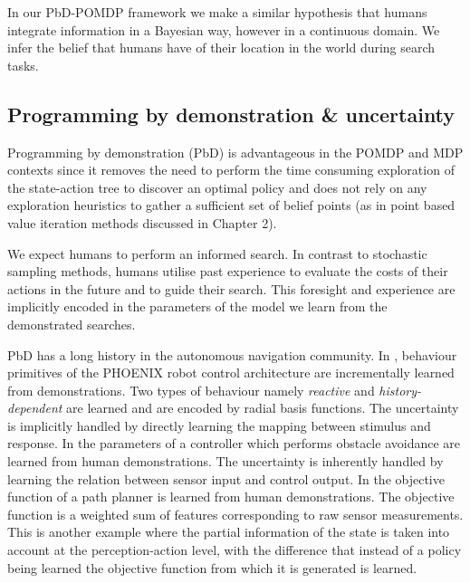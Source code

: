 In our PbD-POMDP framework we make a similar hypothesis that humans integrate information in a Bayesian way, however in a 
continuous domain. We infer the belief that humans have of their location in the world during search tasks.

\subsection{Programming by demonstration \& uncertainty}

Programming by demonstration (PbD) is advantageous in the POMDP and MDP contexts since it removes the need to perform the time 
consuming exploration of the state-action tree to discover an optimal policy and does not rely on any exploration 
heuristics to gather a sufficient set of belief points (as in point based value iteration methods discussed in Chapter 2).

We expect humans to perform an informed search. In contrast to stochastic sampling methods, 
humans utilise past experience to evaluate the costs of their actions in the future and to guide their search. This foresight and experience are implicitly encoded 
in the parameters of the model we learn from the demonstrated searches.

PbD has a long history in the autonomous navigation community. In \cite{Kasper2001153}, behaviour primitives of 
the PHOENIX robot control architecture are incrementally 
learned from demonstrations. Two types of behaviour namely \textit{reactive} and \textit{history-dependent} are 
learned and are encoded by radial basis functions. The
uncertainty is implicitly handled by directly learning the mapping between stimulus and response. In \cite{Hamner_2006_5810} the parameters of a
controller which performs obstacle avoidance are learned from human demonstrations. The uncertainty is inherently handled 
by learning the relation between sensor input and control output. In \cite{LfD_Autonomous_Navigation_in_Complex_Unstructured_Terrain} the objective function of a path planner is learned from human demonstrations. 
The objective function is a weighted sum of features corresponding to raw sensor measurements. This is another example where the partial information of the state is 
taken into account at the perception-action level, with the difference that instead of a policy being learned the objective function from which it is generated is learned. 

